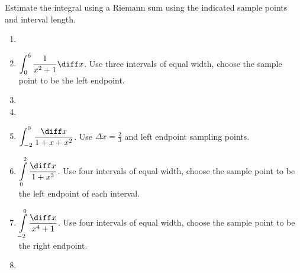 Estimate the integral using a Riemann sum using the indicated sample points and interval length.
\begin{enumerate}[ref={\fcProblemRef}]
\item 
\item $\displaystyle \int_0^6 \frac{1}{x^2+1} \diff x$. Use three intervals of equal width, choose the sample point to be the left endpoint. 

\item 
\item 
\item $\displaystyle\int_{-2}^{0} \frac{\diff x}{1+x+x^2}$. Use $\Delta x=\frac23 $ and left endpoint sampling points.


\item $\displaystyle \int\limits_0^2 \frac{\diff x}{1+x^3}$. Use four intervals of equal width, choose the sample point to be the left endpoint of each interval. 


\item $\displaystyle \int\limits_{-2}^{0} \frac{\diff x}{x^4+1} $. Use four intervals of equal width, choose the sample point to be the right endpoint. 


\item  
\end{enumerate}


